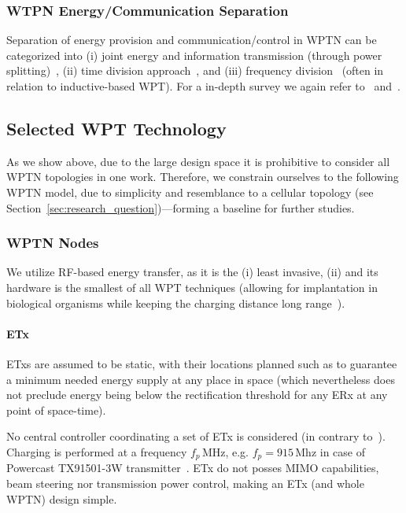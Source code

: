 \documentclass[11pt,draftclsnofoot,journal,onecolumn]{IEEEtran}
\begin{document}
\subsubsection{WTPN Energy/Communication Separation}

Separation of energy provision and communication/control in WPTN can be categorized into (i) joint energy and information transmission (through power splitting)~\cite{timotheou_twc_2014,liu_tcom_2013,huang_arxiv_2012}, (ii) time division approach~\cite{ju_twc_2014,liu_net_2014}, and (iii) frequency division~\cite{xiang_pimrc_2013,wang_tmc_2014} (often in relation to inductive-based WPT). For a in-depth survey we again refer to~\cite[Sec. III-E]{lu_arxiv_2014} and~\cite{bi:2014:arxiv}.

\subsection{Selected WPT Technology}

As we show above, due to the large design space it is prohibitive to consider all WPTN topologies in one work. Therefore, we constrain ourselves to the following WPTN model, due to simplicity and resemblance to a cellular topology (see Section~\ref{sec:research_question})---forming a baseline for further studies.

\subsubsection{WPTN Nodes}

We utilize RF-based energy transfer, as it is the (i) least invasive, (ii) and its hardware is the smallest of all WPT techniques (allowing for implantation in biological organisms while keeping the charging distance long range~\cite{holleman_biocas_2008}).

\paragraph{ETx}
\label{sec:etx}

ETxs are assumed to be static, with their locations planned such as to guarantee a minimum needed energy supply at any place in space (which nevertheless does not preclude energy being below the rectification threshold for any ERx at any point of space-time).

No central controller coordinating a set of ETx is considered (in contrary to~\cite[Sec. III]{chiu_apnoms_2012}). Charging is performed at a frequency $f_p$\,MHz, e.g. $f_p=915$\,Mhz in case of Powercast TX91501-3W transmitter~\cite[/products/powercaster-transmitters]{powercast_website}. ETx do not posses MIMO capabilities, beam steering nor transmission power control, making an ETx (and whole WPTN) design simple.
\end{document}
